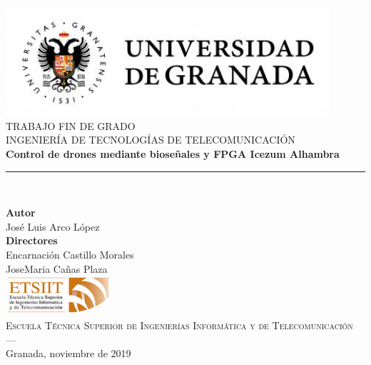 \begin{titlepage}
 
 
\newlength{\centeroffset}
\setlength{\centeroffset}{-0.5\oddsidemargin}
\addtolength{\centeroffset}{0.5\evensidemargin}
\thispagestyle{empty}

\noindent\hspace*{\centeroffset}\begin{minipage}{\textwidth}

\centering
\includegraphics[width=0.9\textwidth]{imagenes/logo_ugr.jpg}\\[1.4cm]

\textsc{ \Large TRABAJO FIN DE GRADO\\[0.2cm]}
\textsc{INGENIERÍA DE TECNOLOGÍAS DE TELECOMUNICACIÓN}\\[1cm]
% 
{\Huge\bfseries Control de drones mediante bioseñales y FPGA Icezum Alhambra\\
}
\noindent\rule[-1ex]{\textwidth}{3pt}\\[3.5ex]
{\large\bfseries }
\end{minipage}

\vspace{0.5cm}
\noindent\hspace*{\centeroffset}\begin{minipage}{\textwidth}
\centering

\textbf{Autor}\\ {José Luis Arco López}\\[2.5ex]
\textbf{Directores}\\
{Encarnación Castillo Morales\\
JoseMaria Cañas Plaza}\\[2cm]
\includegraphics[width=0.3\textwidth]{imagenes/etsiit_logo.png}\\[0.1cm]
\textsc{Escuela Técnica Superior de Ingenierías Informática y de Telecomunicación}\\
\textsc{---}\\
Granada, noviembre de 2019
\end{minipage}
\end{titlepage}


